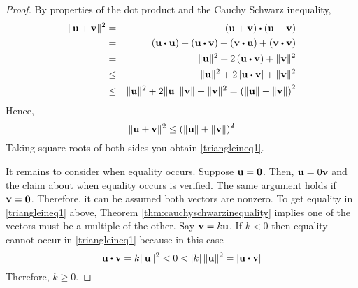 \begin{proof} By properties of the dot product and the Cauchy Schwarz
inequality,
\begin{eqnarray*}
\vectlength \vect{u}+\vect{v}\vectlength ^{2} &=& \left( \vect{u}+\vect{v}\right) \dotprod \left( \vect{u}+\vect{v}\right) \\
& =&\left( \vect{u}\dotprod \vect{u}\right) +\left( \vect{u}\dotprod \vect{v}\right) +\left(\vect{v}\dotprod \vect{u}\right) +\left( \vect{v}\dotprod \vect{v}\right) \\
&=&\vectlength \vect{u}\vectlength ^{2}+2\left( \vect{u}\dotprod \vect{v}\right)+\vectlength \vect{v}\vectlength ^{2} \\
&\leq& \vectlength \vect{u}\vectlength ^{2}+2\left\vert \vect{u}\dotprod \vect{v}\right\vert +\vectlength \vect{v}\vectlength ^{2} \\
&\leq& \vectlength \vect{u}\vectlength ^{2}+2\vectlength \vect{u}\vectlength \vectlength \vect{v}\vectlength +\vectlength \vect{v}\vectlength ^{2} =\left( \vectlength \vect{u}\vectlength +\vectlength \vect{v}\vectlength\right) ^{2}
\end{eqnarray*}
Hence,
\begin{equation*}
\| {\bf u}+{\bf v}\| ^{2} \leq \left( \| {\bf u}\| +\| {\bf v}\|
\right) ^{2}
\end{equation*}
Taking square roots of both sides you obtain \ref{triangleineq1}.

It remains to consider when equality occurs. Suppose ${\bf u} = {\bf 0}$.
Then, ${\bf u} = 0 {\bf v}$ and the claim about when
equality occurs is verified. The same argument holds if ${\bf v} = {\bf 0}$. 
 Therefore, it can be assumed both vectors are
nonzero. To get equality in \ref{triangleineq1} above, Theorem \ref{thm:cauchyschwarzinequality} 
implies one of the vectors must be a multiple of
the other. Say ${\bf v}= k {\bf u}$. If $k <0$ then equality
cannot occur in \ref{triangleineq1} because in this case
\begin{equation*}
\vect{u}\dotprod \vect{v} =k \vectlength \vect{u}\vectlength
^{2}<0<\left| k \right| \vectlength \vect{u}\vectlength ^{2}=\left| \vect{u}\dotprod \vect{v}\right|
\end{equation*}
Therefore, $k \geq 0.$


\end{proof}

